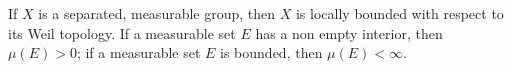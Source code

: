 If $X$ is a separated, measurable group, then $X$ is locally bounded with respect to its Weil topology. If a measurable set $E$ has a non empty interior, then $\mu(E) > 0$; if a measurable set $E$ is bounded, then $\mu(E) < \infty$.
